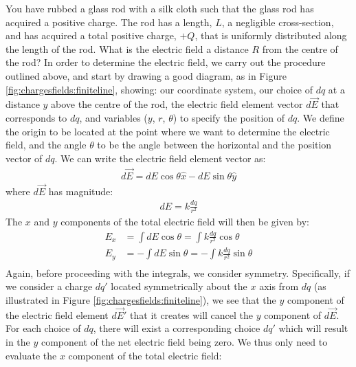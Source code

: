 \begin{example}{\label{ex:chargesfields:finiteline}You have rubbed a glass rod with a silk cloth such that the glass rod has acquired a positive charge. The rod has a length, $L$, a negligible cross-section, and has acquired a total positive charge, $+Q$, that is uniformly distributed along the length of the rod. What is the electric field a distance $R$ from the centre of the rod?}
In order to determine the electric field, we carry out the procedure outlined above, and start by drawing a good diagram, as in Figure \ref{fig:chargesfields:finiteline}, showing: our coordinate system, our choice of $dq$ at a distance $y$ above the centre of the rod, the electric field element vector $d\vec E$ that corresponds to $dq$, and variables ($y$, $r$, $\theta$) to specify the position of $dq$.
We define the origin to be located at the point where we want to determine the electric field, and the angle $\theta$ to be the angle between the horizontal and the position vector of $dq$. We can write the electric field element vector as:
\begin{align*}
d\vec E = dE\cos\theta \hat x - dE\sin\theta \hat y
\end{align*}
where $d\vec E$ has magnitude:
\begin{align*}
dE = k\frac{dq}{r^2}
\end{align*}
The $x$ and $y$ components of the total electric field will then be given by:
\begin{align*}
E_x &= \int dE\cos\theta=\int k\frac{dq}{r^2}\cos\theta \\
E_y &= -\int dE\sin\theta=-\int k\frac{dq}{r^2}\sin\theta\\
\end{align*}
Again, before proceeding with the integrals, we consider symmetry. Specifically, if we consider a charge $dq'$ located symmetrically about the $x$ axis from $dq$ (as illustrated in Figure \ref{fig:chargesfields:finiteline}), we see that the $y$ component of the electric field element $d\vec E'$ that it creates will cancel the $y$ component of $d\vec E$. For each choice of $dq$, there will exist a corresponding choice $dq'$ which will result in the $y$ component of the net electric field being zero. We thus only need to evaluate the $x$ component of the total electric field:
\begin{align*}

\end{align*}
\end{example}

